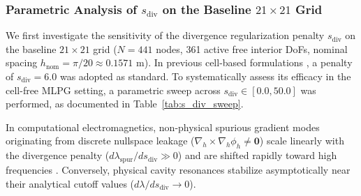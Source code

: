 \documentclass[VANCOUVER,Times1COL]{WileyNJD-v5}
\begin{document}
\subsubsection{Parametric Analysis of $s_{\mathrm{div}}$ on the Baseline $21\times 21$ Grid}
\label{subsubsec:s_div_sweep}

We first investigate the sensitivity of the divergence regularization penalty $s_{\mathrm{div}}$ on the baseline $21 \times 21$ grid ($N = 441$ nodes, 361 active free interior DoFs, nominal spacing $h_{\mathrm{nom}} = \pi/20 \approx 0.1571\text{ m}$). In previous cell-based formulations \cite{stable_vnmm2d_2026}, a penalty of $s_{\mathrm{div}} = 6.0$ was adopted as standard. To systematically assess its efficacy in the cell-free MLPG setting, a parametric sweep across $s_{\mathrm{div}} \in [0.0, 50.0]$ was performed, as documented in Table~\ref{tab:s_div_sweep}.

In computational electromagnetics, non-physical spurious gradient modes originating from discrete nullspace leakage ($\nabla_h \times \nabla_h \phi_h \neq \mathbf{0}$) scale linearly with the divergence penalty ($d\lambda_{\mathrm{spur}} / ds_{\mathrm{div}} \gg 0$) and are shifted rapidly toward high frequencies \cite{jin2014finite, costabel2002weighted, bossavit1990spurious}. Conversely, physical cavity resonances stabilize asymptotically near their analytical cutoff values ($d\lambda / ds_{\mathrm{div}} \to 0$).
\end{document}
